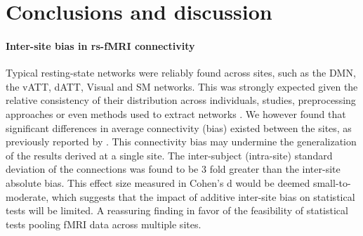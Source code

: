 \documentclass[authoryear]{elsarticle}
\begin{document}

\section{Conclusions and discussion}



\paragraph{Inter-site bias in rs-fMRI connectivity} Typical resting-state networks were reliably found across sites, such as the DMN, the vATT, dATT, Visual and SM networks. This was strongly expected given the relative consistency of their distribution across individuals, studies, preprocessing approaches or even methods used to extract networks \citep{Damoiseaux2006,vandeheuvel2008,Bellec2010c,Yeo2011,Power2011}. We however found that significant differences in average connectivity (bias) existed between the sites, as previously reported by \citep{Yan2013a}. This connectivity bias may undermine the generalization of the results derived at a single site. The inter-subject (intra-site) standard deviation of the connections was found to be 3 fold greater than the inter-site absolute bias. This effect size measured in Cohen's d would be deemed small-to-moderate, which suggests that the impact of additive inter-site bias on statistical tests will be limited. A reassuring finding in favor of the feasibility of statistical tests pooling fMRI data across multiple sites.\\
\end{document}
